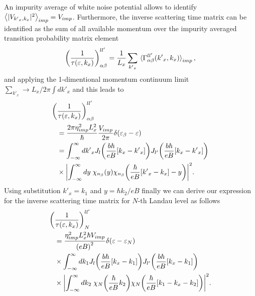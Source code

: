 An impurity average of white noise potential allows to identify $\expval{|V_{{k'}_x,k_x}|^2}_{imp} = V_{imp}$. Furthermore, the inverse scattering time matrix can be identified as the sum of all available momentum over the impurity averaged transition probability matrix element \cite{wackerl20,wackerlthesis20}
\begin{equation} \label{eq_41}
    \qty(\frac{1}{\tau(\varepsilon,k_x)})^{ll'}_{\alpha\beta} =
    \frac{1}{L_x} \sum_{{k'}_x}
    \expval**{\Gamma_{\alpha\beta}^{ll'}({k'}_x,k_x)}_{imp},
\end{equation}
and applying the 1-dimentional momentum continuum limit $\sum_{{k'}_x} \longrightarrow {L_x}/{2\pi}\int d {k'}_x$ and this leads to
\begin{equation} \label{eq_42}
  \begin{aligned}
    \bigg(&\frac{1}{\tau(\varepsilon,k_x)}\bigg)^{ll'}_{\alpha\beta} \\
    & =
    \frac { 2\pi \eta_{imp}^2 L_x^2}{ \hbar}
    \frac{V_{imp}}{2\pi}
    \delta(\varepsilon_{\beta} - \varepsilon)\\
    & =
    \int_{-\infty}^{\infty} d {k'}_x
    J_l\qty(\frac{b\hbar}{eB}[{k}_x - {k'}_x])
    J_{l'}\qty(\frac{b\hbar}{eB}[{k}_x - {k'}_x]) \\
    & \times
    \qty|
    \int_{-\infty}^{\infty} dy \;
    {\chi}_{n_{\beta}}\qty(y)
    {\chi}_{n_{\beta}}\qty(\frac{\hbar}{eB} \qty[{k'}_x - {k}_x] - y)|^2.
  \end{aligned}
\end{equation}
Using substitution $k'_x = k_1$ and $y = {\hbar{k_2}}/{eB}$ finally we can derive our expression for the inverse scattering time matrix for $N$-th Landau
level as follows
\begin{equation} \label{eq_43}
  \begin{aligned}
    \bigg(&\frac{1}{\tau(\varepsilon,k_x)}\bigg)^{ll'}_{N} \\
    & =
    \frac { \eta_{imp}^2 L_x^2 \hbar V_{imp}}{\qty(eB)^2}
    \delta(\varepsilon - \varepsilon_{N})\\
    & \times
    \int_{-\infty}^{\infty} d k_1
    J_l\qty(\frac{b\hbar}{eB}[{k}_x - k_1])
    J_{l'}\qty(\frac{b\hbar}{eB}[{k}_x - k_1]) \\
    & \times
    \qty|
    \int_{-\infty}^{\infty} dk_2 \;
    {\chi}_{N}\qty(\frac{\hbar}{eB}k_2)
    {\chi}_{N}\qty(\frac{\hbar}{eB} \qty[k_1 - {k}_x - k_2])|^2.
  \end{aligned}
\end{equation}
